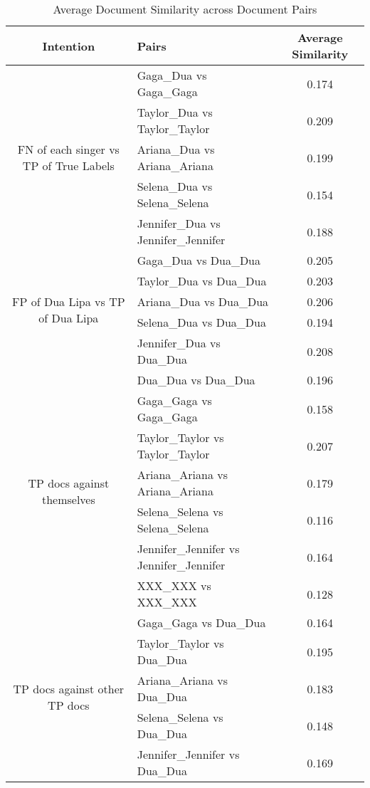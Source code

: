 \documentclass[a4paper,11pt]{article}
\begin{document}
\begin{table}[htbp]
\centering
\caption{Average Document Similarity across Document Pairs}
\small
\begin{tabular}{|c|l|c|}
\hline
\textbf{Intention} & \textbf{Pairs} & \textbf{Average Similarity} \\ \hline
\multirow{5}{*}{FN of each singer vs TP of True Labels} & Gaga\_Dua vs Gaga\_Gaga & 0.174 \\
& Taylor\_Dua vs Taylor\_Taylor & 0.209 \\
& Ariana\_Dua vs Ariana\_Ariana & 0.199 \\
& Selena\_Dua vs Selena\_Selena & 0.154 \\
& Jennifer\_Dua vs Jennifer\_Jennifer & 0.188 \\
\hline
\multirow{5}{*}{FP of Dua Lipa vs TP of Dua Lipa} & Gaga\_Dua vs Dua\_Dua & 0.205 \\
& Taylor\_Dua vs Dua\_Dua & 0.203 \\
& Ariana\_Dua vs Dua\_Dua & 0.206 \\
& Selena\_Dua vs Dua\_Dua & 0.194 \\
& Jennifer\_Dua vs Dua\_Dua & 0.208 \\
\hline
\multirow{7}{*}{TP docs against themselves} & Dua\_Dua vs Dua\_Dua & 0.196 \\
& Gaga\_Gaga vs Gaga\_Gaga & 0.158 \\
& Taylor\_Taylor vs Taylor\_Taylor & 0.207 \\
& Ariana\_Ariana vs Ariana\_Ariana & 0.179 \\
& Selena\_Selena vs Selena\_Selena & 0.116 \\
& Jennifer\_Jennifer vs Jennifer\_Jennifer & 0.164 \\
& XXX\_XXX vs XXX\_XXX & 0.128 \\
\hline
\multirow{5}{*}{TP docs against other TP docs} & Gaga\_Gaga vs Dua\_Dua & 0.164 \\
& Taylor\_Taylor vs Dua\_Dua & 0.195 \\
& Ariana\_Ariana vs Dua\_Dua & 0.183 \\
& Selena\_Selena vs Dua\_Dua & 0.148 \\
& Jennifer\_Jennifer vs Dua\_Dua & 0.169 \\
\hline
\end{tabular}
\label{tab:accuracy}
\end{table}
\end{document}

